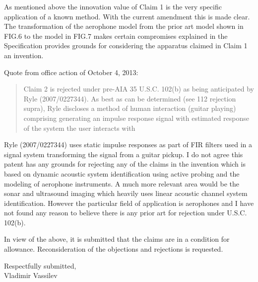 As mentioned above the innovation value of Claim 1 is the very specific application of a known method. With the current amendment this is made clear. The transformation of the aerophone model from the prior art model shown in FIG.6 to the model in FIG.7 makes certain compromises explained in the Specification provides grounds for considering the apparatus claimed in Claim 1 an invention.

Quote from office action of October 4, 2013:

\begin{quote}
Claim 2 is rejected under pre-AIA 35 U.S.C. 102(b) as being anticipated by Ryle
(2007/0227344). As best as can be determined (see 112 rejection supra), Ryle
discloses a method of human interaction (guitar playing) comprising generating an
impulse response signal with estimated response of the system the user interacts with
\end{quote}

Ryle (2007/0227344) uses static impulse responses as part of FIR filters used in a signal system transforming the signal from a guitar pickup. I do not agree this patent has any grounds for rejecting any of the claims in the invention which is based on dynamic acoustic system identification using active probing and the modeling of aerophone instruments. A much more relevant area would be the sonar and ultrasound imaging which heavily uses linear acoustic channel system identification. However the particular field of application is aerophones and I have not found any reason to believe there is any prior art for rejection under U.S.C. 102(b).

In view of the above, it is submitted that the claims are in a condition for allowance. Reconsideration of the objections and rejections is requested.

\setlength\parindent{3.6in}
Respectfully submitted, \\Vladimir Vassilev


